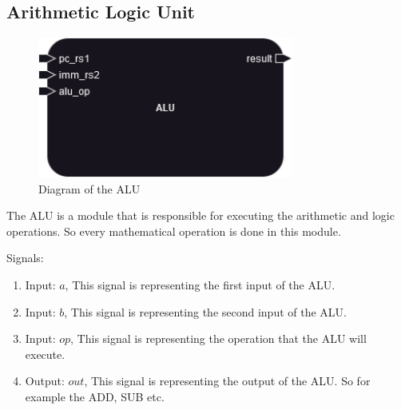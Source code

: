 \subsection{Arithmetic Logic Unit}

\begin{figure}[H]
\centering
\includegraphics[width=0.75\textwidth]{../diagrams/execute/alu.png}
\caption{Diagram of the ALU}
\label{fig:alu}
\end{figure}

The ALU is a module that is responsible for executing the arithmetic and logic operations. So every mathematical operation is done in this module.

Signals:
\begin{enumerate}[label={\textbullet}]
    \item Input: $a$, This signal is representing the first input of the ALU.
    \item Input: $b$, This signal is representing the second input of the ALU.
    \item Input: $op$, This signal is representing the operation that the ALU will execute.
    \item Output: $out$, This signal is representing the output of the ALU. So for example the 
    ADD, SUB etc.
\end{enumerate}